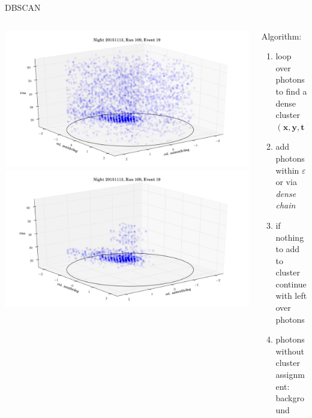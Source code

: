 \begin{frame}[c]{DBSCAN}
\begin{columns}[onlytextwidth]
    \begin{column}{0.475\textwidth}
        \begin{overprint}
            \includegraphics[width=1.2\textwidth]{fig/event2.png}
            \includegraphics[width=1.2\textwidth]{fig/event1.png}
        \end{overprint}
    \end{column}
    \begin{column}{0.475\textwidth}
      Algorithm:
      \begin{enumerate}
        \item loop over photons to find a dense cluster $(\mathbf{x}, \mathbf{y}, \mathbf{t})$
        \item add photons within $\varepsilon$ or via \textit{dense chain}
        \item if nothing to add to cluster continue with left over photons
        \item photons without cluster assignment: background
      \end{enumerate}
    \end{column}
\end{columns}
\end{frame}

